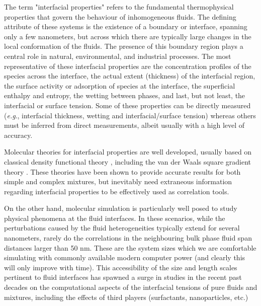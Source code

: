 \documentclass[9pt,bestpractices]{livecoms}
\begin{document}
The term "interfacial properties" refers to the fundamental thermophysical
properties that govern the behaviour of inhomogeneous fluids. The defining
attribute of these systems is the existence of a boundary or interface,
spanning only a few nanometers, but across which there are typically large
changes in the local conformation of the fluids. The presence of this boundary
region plays a central role in natural, environmental, and industrial
processes. The most representative of these interfacial properties are the
concentration profiles of the species across the interface, the actual extent
(thickness) of the interfacial region, the surface activity or adsorption of
species at the interface, the superficial enthalpy and entropy, the wetting
between phases, and last, but not least, the interfacial or surface tension.
Some of these properties can be directly measured (\textit{e.g}., interfacial
thickness, wetting and interfacial/surface tension) \citep{evans2006}
whereas others must be inferred from direct measurements, albeit
usually with a high level of accuracy. 

Molecular theories for interfacial properties are well developed, usually based
on classical density functional theory \citep{evans1992}, including the van der Waals square gradient
theory \citep{davis1982}.
These theories have been shown to provide accurate results for both simple and
complex mixtures, but inevitably need extraneous information regarding
interfacial properties to be effectively used as correlation tools.

On the other hand, molecular simulation is particularly well posed to study
physical phenomena at the fluid interfaces. In these scenarios, while the
perturbations caused by the fluid heterogeneities typically extend for several
nanometers, rarely do the correlations in the neighbouring bulk phase fluid
span distances larger than 50 nm. These are the system sizes which we are
comfortable simulating with commonly available modern computer power (and
clearly this will only improve with time). This accessibility of the size and
length scales pertinent to fluid interfaces has spawned a surge in studies in
the recent past decades on the computational aspects of the interfacial
tensions of pure fluids and mixtures, including the effects of third players
(surfactants, nanoparticles, etc.) 
\end{document}
